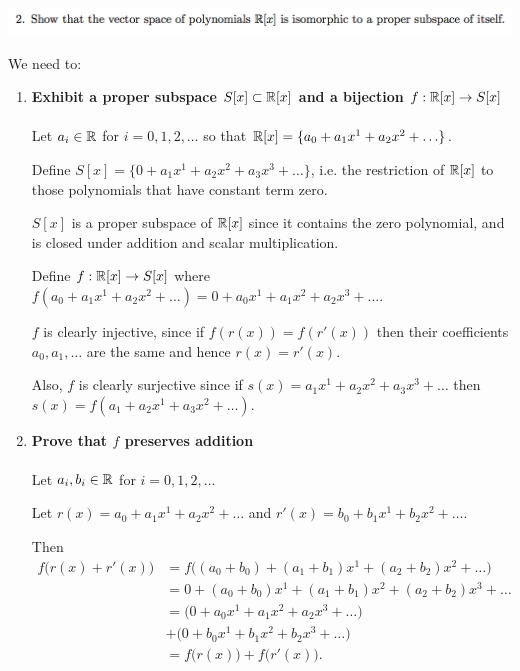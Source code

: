 \documentclass[12pt]{article}
\begin{document}
\subsection*{} %
\begin{mdframed}
\includegraphics[width=450pt]{img/linear-algebra-a0-1-2.png}\\
\end{mdframed}
We need to:
\begin{enumerate}
\item \textbf{Exhibit a proper subspace $S[x] \subset \mathbb{R}[x]$ and a bijection $f:\mathbb{R}[x] \to S[x]$}\\\\
  Let $a_i \in \mathbb{R}$ for $i = 0, 1, 2, \ldots$ so that
  $\mathbb{R}[x] = \{a_0 + a_1x^1 + a_2x^2 + \ldots\}$.

  Define $S[x] = \{0 + a_1x^1 + a_2x^2 + a_3x^3 + \ldots\}$, i.e. the restriction
  of $\mathbb{R}[x]$ to those polynomials that have constant term zero.

  $S[x]$ is a proper subspace of $\mathbb{R}[x]$ since it contains the zero polynomial,
  and is closed under addition and scalar multiplication.

  Define $f: \mathbb{R}[x] \to S[x]$ where
  $f(a_0 + a_1x^1 + a_2x^2 + \ldots) = 0 + a_0x^1 + a_1x^2 + a_2x^3 + \ldots$.

  $f$ is clearly injective, since if $f(r(x)) = f(r'(x))$ then their
  coefficients $a_0, a_1, \ldots$ are the same and hence $r(x) = r'(x)$.

  Also, $f$ is clearly surjective since if
  $s(x) = a_1x^1 + a_2x^2 + a_3x^3 + \ldots$ then
  $s(x) = f(a_1 + a_2x^1 + a_3x^2 + \ldots)$.

\item \textbf{Prove that $f$ preserves addition}\\\\
  Let $a_i,b_i \in \mathbb{R}$ for $i = 0, 1, 2, \ldots$

  Let $r(x) = a_0 + a_1x^1 + a_2x^2 + \ldots$ and $r'(x) = b_0 + b_1x^1 + b_2x^2 + \ldots$.

  Then
  \begin{align*}
    f\Big(r(x) + r'(x)\Big)
    &= f\Big((a_0 + b_0) + (a_1 + b_1)x^1 + (a_2 + b_2)x^2 + \ldots\Big)\\
    &= 0 + (a_0 + b_0)x^1 + (a_1 + b_1)x^2 + (a_2 + b_2)x^3 + \ldots\\
    &= \Big(0 + a_0x^1 + a_1x^2 + a_2x^3 + \ldots \Big) \\
    &+ \Big(0 + b_0x^1 + b_1x^2 + b_2x^3 + \ldots \Big) \\
    &= f\Big(r(x)\Big) + f\Big(r'(x)\Big).
  \end{align*}


\end{enumerate}
\end{document}
